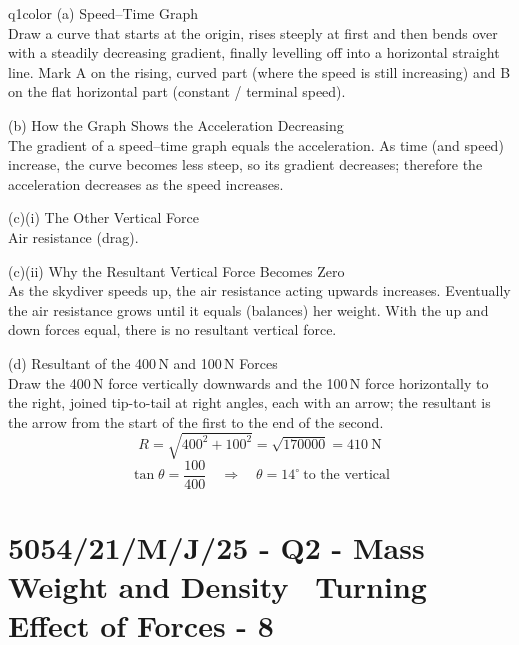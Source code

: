 \documentclass[11pt,a4paper]{article}
\newcommand{\examq}[4]{\section[#1 - Q#2]{#1 - Q#2 - #3 - #4}}
\begin{document}
\begin{ansbox}{q1color}
(a) Speed--Time Graph\\[4pt]
Draw a curve that starts at the origin, rises steeply at first and then bends over with a steadily decreasing gradient, finally levelling off into a horizontal straight line. Mark A on the rising, curved part (where the speed is still increasing) and B on the flat horizontal part (constant / terminal speed).

\vspace{4pt}
(b) How the Graph Shows the Acceleration Decreasing\\[4pt]
The gradient of a speed--time graph equals the acceleration. As time (and speed) increase, the curve becomes less steep, so its gradient decreases; therefore the acceleration decreases as the speed increases.

\vspace{4pt}
(c)(i) The Other Vertical Force\\[4pt]
Air resistance (drag).

\vspace{4pt}
(c)(ii) Why the Resultant Vertical Force Becomes Zero\\[4pt]
As the skydiver speeds up, the air resistance acting upwards increases. Eventually the air resistance grows until it equals (balances) her weight. With the up and down forces equal, there is no resultant vertical force.

\vspace{4pt}
(d) Resultant of the 400\,N and 100\,N Forces\\[4pt]
Draw the 400\,N force vertically downwards and the 100\,N force horizontally to the right, joined tip-to-tail at right angles, each with an arrow; the resultant is the arrow from the start of the first to the end of the second.
\[ R = \sqrt{400^{2} + 100^{2}} = \sqrt{170000} = \boxed{410\ \text{N}} \]
\[ \tan\theta = \frac{100}{400} \quad\Rightarrow\quad \theta = \boxed{14^{\circ}\ \text{to the vertical}} \]
\end{ansbox}

\examq{5054/21/M/J/25}{2}{Mass Weight and Density \textperiodcentered\ Turning Effect of Forces}{8}
\end{document}
